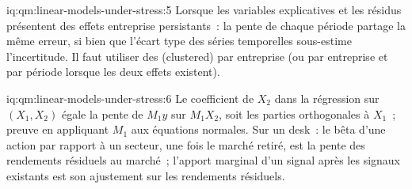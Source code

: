 \begin{solution}{iq:qm:linear-models-under-stress:5}
Lorsque les variables explicatives et les résidus présentent des effets entreprise persistants~: la pente de chaque période partage la même erreur, si bien que l'écart type des séries temporelles
sous-estime l'incertitude. Il faut utiliser des  (clustered) par entreprise (ou par entreprise et par période lorsque les deux effets existent).
\end{solution}

\begin{solution}{iq:qm:linear-models-under-stress:6}
Le coefficient de $X_2$ dans la régression sur $(X_1, X_2)$ égale la pente de $M_1y$ sur $M_1X_2$, soit les parties orthogonales à $X_1$~; preuve en appliquant
$M_1$ aux équations normales. Sur un desk~: le bêta d'une action par rapport à un secteur, une fois le marché retiré, est la pente des rendements résiduels au marché~; l'apport marginal d'un signal
après les signaux existants est son ajustement sur les rendements résiduels.
\end{solution}
